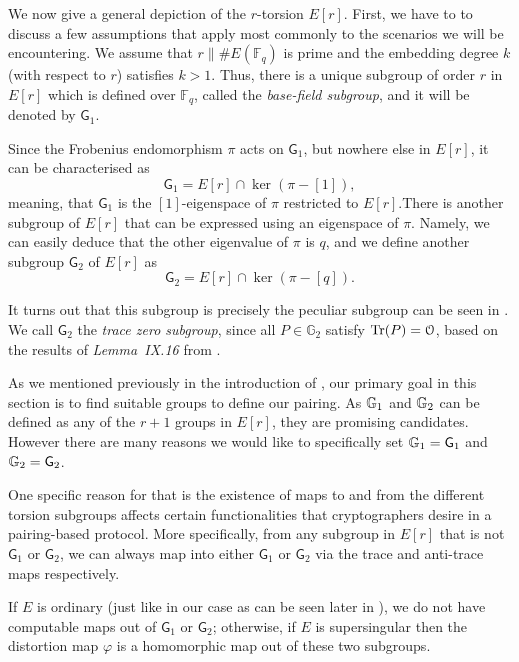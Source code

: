 We now give a general depiction of the $r$-torsion $E[r]$. First, we have to
to discuss a few assumptions that apply most commonly to the scenarios we will
be encountering. We assume that $r \| \#E(\mathbb{F}_q)$ is prime and
the embedding degree $k$ (with respect to $r$) satisfies $k > 1$. Thus, there
is a unique subgroup of order $r$ in $E[r]$ which is defined over $\mathbb{F}_q$,
called the \emph{base-field subgroup}, and  it will be denoted by $\mathsf{G}_1$. 

Since the Frobenius endomorphism $\pi$ acts  on $\mathsf{G}_1$, but nowhere
else in $E[r]$, it can be characterised as 
\[
\mathsf{G}_1 = E[r] \cap \ker(\pi - [1]),
\]
meaning, that $\mathsf{G}_1$ is the $[1]$-eigenspace of $\pi$ restricted to $E[r]$.There is another subgroup of $E[r]$ that can be expressed using an eigenspace
of $\pi$. Namely, we can easily deduce that the other
eigenvalue of $\pi$ is $q$, and we define another subgroup $\mathsf{G}_2$ of
$E[r]$ as
\[
\mathsf{G}_2 = E[r] \cap \ker(\pi - [q]).
\]

It turns out that this subgroup is precisely the peculiar subgroup can be seen in . We call $\mathsf{G}_2$ the \emph{trace zero subgroup}, since
all $P \in \mathbb{G}_2$ satisfy $\mathrm{Tr}(P) = \EuScript{O}$, based on the results of \textit{Lemma~IX.16} from \cite{Gal05}.

As we mentioned previously in the introduction of , our primary goal in this section is to find suitable groups to define our pairing. As $\mathbb{G}_1$ and $\mathbb{G}_2$ can be defined as any of the $r + 1$ groups in $E[r]$, they are promising candidates. However there are many reasons we would like to specifically set $\mathbb{G}_1 = \mathsf{G}_1$ and 
$\mathbb{G}_2 = \mathsf{G}_2$.  

One specific reason for that is the existence of maps to and from the different
torsion subgroups affects certain functionalities that cryptographers desire in a pairing-based protocol. More specifically, from any subgroup in $E[r]$ that is not $\mathsf{G}_1$ or $\mathsf{G}_2$, we can always map into either $\mathsf{G}_1$ or $\mathsf{G}_2$ via the trace and anti-trace maps
respectively. 

If $E$ is ordinary (just like in our case as can be seen later in ), we do not have computable maps out of
$\mathsf{G}_1$ or $\mathsf{G}_2$; otherwise, if $E$ is supersingular then the
distortion map $\varphi$ is a homomorphic map out of these two subgroups.

